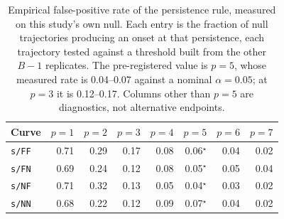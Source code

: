 \begin{table}[t]
\centering
\caption{Empirical false-positive rate of the persistence rule, measured on this study's own null. Each entry is the fraction of null trajectories producing an onset at that persistence, each trajectory tested against a threshold built from the other $B-1$ replicates. The pre-registered value is $p=5$, whose measured rate is 0.04--0.07 against a nominal $\alpha=0.05$; at $p=3$ it is 0.12--0.17. Columns other than $p=5$ are diagnostics, not alternative endpoints.}
\label{tab:onset-fpr}
\begin{tabular}{lrrrrrrr}
\toprule
Curve & $p=1$ & $p=2$ & $p=3$ & $p=4$ & $p=5$ & $p=6$ & $p=7$ \\
\midrule
\texttt{s/FF} & 0.71 & 0.29 & 0.17 & 0.08 & 0.06$^{\star}$ & 0.04 & 0.02 \\
\texttt{s/FN} & 0.69 & 0.24 & 0.12 & 0.08 & 0.05$^{\star}$ & 0.05 & 0.04 \\
\texttt{s/NF} & 0.71 & 0.32 & 0.13 & 0.05 & 0.04$^{\star}$ & 0.03 & 0.02 \\
\texttt{s/NN} & 0.68 & 0.22 & 0.12 & 0.09 & 0.07$^{\star}$ & 0.04 & 0.02 \\
\bottomrule
\end{tabular}
\end{table}
